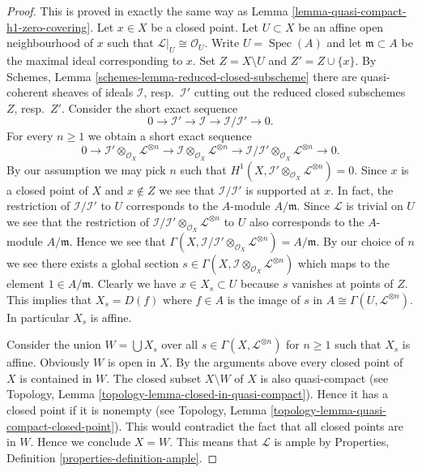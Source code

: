 \documentclass{stacks-project}
\theoremstyle{plain}
\theoremstyle{definition}
\theoremstyle{remark}
\numberwithin{equation}{subsection}
\def\Spec{\mathop{\mathrm{Spec}}}
\begin{document}
\begin{proof}
This is proved in exactly the same way as
Lemma \ref{lemma-quasi-compact-h1-zero-covering}.
Let $x \in X$ be a closed point. Let $U \subset X$ be an affine open
neighbourhood of $x$ such that $\mathcal{L}|_U \cong \mathcal{O}_U$.
Write $U = \Spec(A)$ and let
$\mathfrak m \subset A$ be the maximal ideal corresponding to $x$.
Set $Z = X \setminus U$ and $Z' = Z \cup \{x\}$.
By Schemes, Lemma \ref{schemes-lemma-reduced-closed-subscheme} there
are quasi-coherent sheaves of ideals
$\mathcal{I}$, resp.\ $\mathcal{I}'$ cutting out
the reduced closed subschemes $Z$, resp.\ $Z'$.
Consider the short exact sequence
$$
0 \to \mathcal{I}' \to \mathcal{I} \to \mathcal{I}/\mathcal{I}' \to 0.
$$
For every $n \geq 1$ we obtain a short exact sequence
$$
0 \to \mathcal{I}' \otimes_{\mathcal{O}_X} \mathcal{L}^{\otimes n}
\to \mathcal{I} \otimes_{\mathcal{O}_X} \mathcal{L}^{\otimes n} \to
\mathcal{I}/\mathcal{I}' \otimes_{\mathcal{O}_X} \mathcal{L}^{\otimes n} \to 0.
$$
By our assumption we may pick $n$ such that
$H^1(X, \mathcal{I}' \otimes_{\mathcal{O}_X} \mathcal{L}^{\otimes n}) = 0$.
Since $x$ is a closed point of $X$ and $x \not \in Z$ we see that
$\mathcal{I}/\mathcal{I}'$ is supported at $x$. In fact, the restriction
of $\mathcal{I}/\mathcal{I'}$ to $U$ corresponds to the $A$-module
$A/\mathfrak m$. Since $\mathcal{L}$ is trivial on $U$
we see that the restriction of
$\mathcal{I}/\mathcal{I}' \otimes_{\mathcal{O}_X} \mathcal{L}^{\otimes n}$
to $U$ also corresponds to the $A$-module $A/\mathfrak m$.
Hence we see that
$\Gamma(X, \mathcal{I}/\mathcal{I'} \otimes_{\mathcal{O}_X}
\mathcal{L}^{\otimes n}) = A/\mathfrak m$.
By our choice of $n$ we see there exists a global section
$s \in \Gamma(X, \mathcal{I} \otimes_{\mathcal{O}_X} \mathcal{L}^{\otimes n})$
which maps to the element $1 \in A/\mathfrak m$. Clearly we have
$x \in X_s \subset U$ because $s$ vanishes at points of $Z$.
This implies that $X_s = D(f)$ where
$f \in A$ is the image of $s$ in $A \cong \Gamma(U, \mathcal{L}^{\otimes n})$.
In particular $X_s$ is affine.

\medskip\noindent
Consider the union $W = \bigcup X_s$ over all
$s \in \Gamma(X, \mathcal{L}^{\otimes n})$ for $n \geq 1$
such that $X_s$ is affine. Obviously $W$ is open in $X$.
By the arguments above every closed point of
$X$ is contained in $W$. The closed subset $X \setminus W$ of $X$
is also quasi-compact
(see Topology, Lemma \ref{topology-lemma-closed-in-quasi-compact}).
Hence it has a closed point if it is nonempty (see
Topology, Lemma \ref{topology-lemma-quasi-compact-closed-point}).
This would contradict the fact that all closed points are in
$W$. Hence we conclude $X = W$. This means that $\mathcal{L}$
is ample by Properties, Definition \ref{properties-definition-ample}.
\end{proof}
\end{document}
